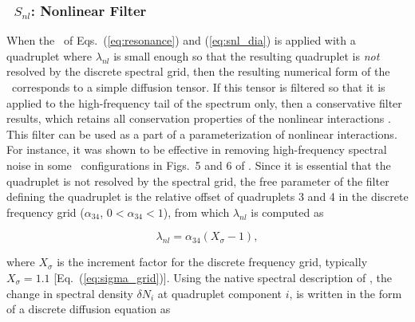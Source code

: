 \vsssub
\subsubsection{~$S_{nl}$: Nonlinear Filter} \label{sec:NLS}
\vsssub


\noindent
When the \dia\ of Eqs.~(\ref{eq:resonance}) and (\ref{eq:snl_dia}) is applied
with a quadruplet where $\lambda_{nl}$ is small enough so that the resulting
quadruplet is {\em not} resolved by the discrete spectral grid, then the
resulting numerical form of the \dia\ corresponds to a simple diffusion
tensor. If this tensor is filtered so that it is applied to the high-frequency
tail of the spectrum only, then a conservative filter results, which retains
all conservation properties of the nonlinear interactions \citep{tol:MMAB08b,
tol:OMOD11}. This filter can be used as a part of a parameterization of
nonlinear interactions.  For instance, it was shown to be effective in
removing high-frequency spectral noise in some \gmd\ configurations in Figs.~5
and 6 of \cite{tol:OMOD11}. Since it is essential that the quadruplet is not
resolved by the spectral grid, the free parameter of the filter defining the
quadruplet is the relative offset of quadruplets 3 and 4 in the discrete
frequency grid ($\alpha_{34}$, $0 < \alpha_{34} < 1$), from which
$\lambda_{nl}$ is computed as


\begin{equation}
\lambda_{nl} = \alpha_{34} (X_{\sigma}-1) , \label{eq:nls_a34}
\end{equation}

\noindent 
where $X_{\sigma}$ is the increment factor for the discrete frequency grid, typically $X_{\sigma}=1.1$
[Eq.~(\ref{eq:sigma_grid})]. Using the native spectral description of \ws, the
change in spectral density $\delta N_i$ at quadruplet component $i$, is
written in the form of a discrete diffusion equation as \citep[page
294]{tol:OMOD11}


